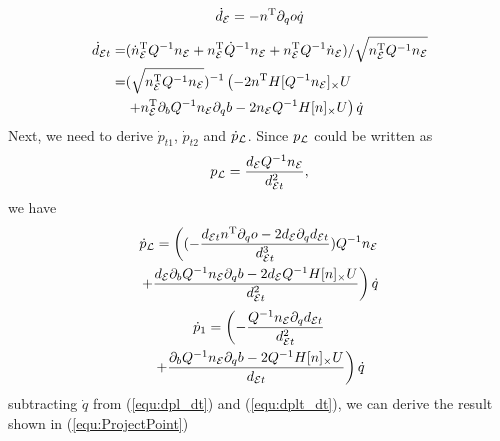 \documentclass[10pt,twocolumn,twoside]{IEEEtran}
\begin{document}
    \begin{equation}
      \dot d_{\mathcal{E}} = -n^\mathrm{T} \partial_q o \dot q
    \end{equation}
    \begin{equation}\label{equ:dot det}
      \begin{split}
        \dot d_{\mathcal{E} t} =&  (\dot n_{\mathcal{E}}^\mathrm{T} Q^{-1} n_{\mathcal{E}} + n_{\mathcal{E}}^\mathrm{T} \dot Q^{-1} n_{\mathcal{E}} + n_{\mathcal{E}}^\mathrm{T} Q^{-1} \dot n_{\mathcal{E}}) /\sqrt{n_{\mathcal{E}}^\mathrm{T} Q^{-1} n_{\mathcal{E}}}\\
        = & (\sqrt{n_{\mathcal{E}}^\mathrm{T} Q^{-1} n_{\mathcal{E}}})^{-1}\left(-2n^\mathrm{T} H[Q^{-1}n_{\mathcal{E}}]_\times U \right.\\
        &\left. + n_{\mathcal{E}} ^\mathrm{T} \partial_b Q^{-1} n_{\mathcal{E}} \partial_q b  -2 n_{\mathcal{E}} Q^{-1}H[n]_\times U \right) \dot q
      \end{split}
    \end{equation}
    Next, we need to derive  $\dot p_{t1}$, $\dot p_{t2} $ and $\dot p_{\mathcal{L}}$. Since $p_{\mathcal{L}}$ could be written as
    \begin{equation}
      p_{\mathcal{L}} = \frac{d_{\mathcal{E}} Q^{-1} n_{\mathcal{E}}}{ d_{\mathcal{E} t} ^2},
    \end{equation}
    we have
    \begin{multline}\label{equ:dpl_dt}
        \dot p_{\mathcal{L}} =  \left( (-\frac{d_{\mathcal{E} t} n^\mathrm{T} \partial_q o -2d_{\mathcal{E}} \partial_q d_{\mathcal{E} t}}{d_{\mathcal{E} t}^3} )Q^{-1}n_{\mathcal{E}} \right.\\
        \left .+ \frac{d_{\mathcal{E}}\partial_b Q^{-1} n_{\mathcal{E}} \partial_q b -  2d_{\mathcal{E}} Q^{-1}H[n]_\times U}{d_{\mathcal{E} t}^2}\right) \dot q
    \end{multline}
    \begin{multline}\label{equ:dplt_dt}
        \dot p_{1} =  \left(-\frac{Q^{-1}n_{\mathcal{E}} \partial_q d_{\mathcal{E} t} }{d_{\mathcal{E} t}^2} \right.\\
         \left. + \frac{\partial_b Q^{-1}n_{\mathcal{E}} \partial_q b -  2Q^{-1}H[n]_\times U }{d_{\mathcal{E} t}} \right) \dot q
    \end{multline}
    subtracting $\dot q$ from (\ref{equ:dpl_dt}) and (\ref{equ:dplt_dt}), we can derive the result shown in (\ref{equ:ProjectPoint})


{\small


}
\end{document}
